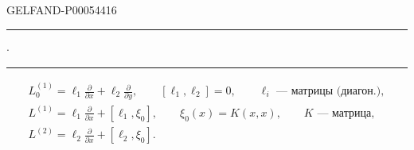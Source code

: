 \begin{GelfandAdjacentEvidence}{GELFAND-P000544}{16}

\hfill\rule{1.3cm}{.35pt}\enspace\(\cdot\)\enspace\rule{1.3cm}{.35pt}\par

\begin{gather*}
L_0^{(1)}=\ell_1\frac{\partial}{\partial x}+\ell_2\frac{\partial}{\partial y},
\qquad [\ell_1,\ell_2]=0,\qquad
\ell_i\text{ — матрицы (диагон.)},\\
L^{(1)}=\ell_1\frac{\partial}{\partial x}+[\ell_1,\xi_0],\qquad
\xi_0(x)=K(x,x),\qquad K\text{ — матрица},\\
L^{(2)}=\ell_2\frac{\partial}{\partial x}+[\ell_2,\xi_0].
\end{gather*}
\end{GelfandAdjacentEvidence}



